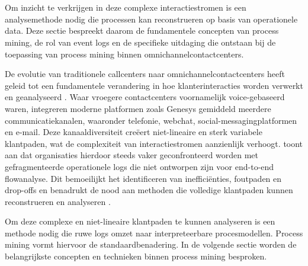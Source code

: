 \chapter{}%
\label{ch:stand-van-zaken}


Om inzicht te verkrijgen in deze complexe interactiestromen is een analysemethode nodig die processen kan reconstrueren op basis van operationele data. Deze sectie bespreekt daarom de fundamentele concepten van process mining, de rol van event logs en de specifieke uitdaging die ontstaan bij de toepassing van process mining binnen omnichannelcontactcenters.

De evolutie van traditionele callcenters naar omnichannelcontactcenters heeft geleid tot een fundamentele verandering in hoe klanterinteracties worden verwerkt en geanalyseerd \autocite{kalra2024}. Waar vroegere contactcenters voornamelijk voice-gebaseerd waren, integreren moderne platformen zoals Genesys gemiddeld meerdere communicatiekanalen, waaronder telefonie, webchat, social-messagingplatformen en e-mail. Deze kanaaldiversiteit creëert niet-lineaire en sterk variabele klantpaden, wat de complexiteit van interactiestromen aanzienlijk verhoogt. \textcite{kalra2024} toont aan dat organisaties hierdoor steeds vaker geconfronteerd worden met gefragmenteerde operationele logs die niet ontworpen zijn voor end-to-end flowanalyse. Dit bemoeilijkt het identificeren van inefficiënties, foutpaden en drop-offs en benadrukt de nood aan methoden die volledige klantpaden kunnen reconstrueren en analyseren \autocite{kalra2024}.

Om deze complexe en niet-lineaire klantpaden te kunnen analyseren is een methode nodig die ruwe logs omzet naar interpreteerbare procesmodellen. Process mining vormt hiervoor de standaardbenadering. In de volgende sectie worden de belangrijkste concepten en technieken binnen process mining besproken.

